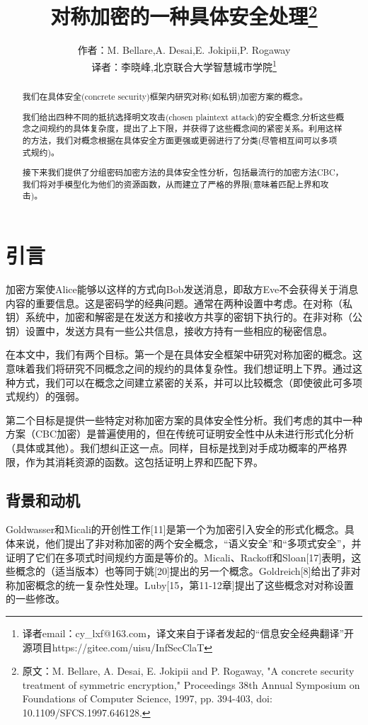 \documentclass[]{article}
\title{对称加密的一种具体安全处理\footnote{原文：M. Bellare, A. Desai, E. Jokipii and P. Rogaway, "A concrete security treatment of symmetric encryption," Proceedings 38th Annual Symposium on Foundations of Computer Science, 1997, pp. 394-403, doi: 10.1109/SFCS.1997.646128.}}
\author{作者：M. Bellare,A. Desai,E. Jokipii,P. Rogaway\\
\small{译者：李晓峰,北京联合大学智慧城市学院\footnote{译者email：cy\_lxf@163.com，译文来自于译者发起的“信息安全经典翻译”开源项目https://gitee.com/uisu/InfSecClaT}}
}
\begin{document}
\maketitle

\begin{abstract}
我们在具体安全(concrete security)框架内研究对称(如私钥)加密方案的概念。\par
我们给出四种不同的抵抗选择明文攻击(chosen plaintext attack)的安全概念,分析这些概念之间规约的具体复杂度，提出了上下限，并获得了这些概念间的紧密关系。利用这样的方法，我们对概念根据在具体安全方面更强或更弱进行了分类(尽管相互间可以多项式规约)。\par
接下来我们提供了分组密码加密方法的具体安全性分析，包括最流行的加密方法CBC，我们将对手模型化为他们的资源函数，从而建立了严格的界限(意味着匹配上界和攻击)。
\end{abstract}

\section{引言}
加密方案使Alice能够以这样的方式向Bob发送消息，即敌方Eve不会获得关于消息内容的重要信息。这是密码学的经典问题。通常在两种设置中考虑。在对称（私钥）系统中，加密和解密是在发送方和接收方共享的密钥下执行的。在非对称（公钥）设置中，发送方具有一些公共信息，接收方持有一些相应的秘密信息。\par

在本文中，我们有两个目标。第一个是在具体安全框架中研究对称加密的概念。这意味着我们将研究不同概念之间的规约的具体复杂性。我们想证明上下界。通过这种方式，我们可以在概念之间建立紧密的关系，并可以比较概念（即使彼此可多项式规约）的强弱。\par

第二个目标是提供一些特定对称加密方案的具体安全性分析。我们考虑的其中一种方案（CBC加密）是普遍使用的，但在传统可证明安全性中从未进行形式化分析（具体或其他）。我们想纠正这一点。同样，目标是找到对手成功概率的严格界限，作为其消耗资源的函数。这包括证明上界和匹配下界。

\subsection{背景和动机}
Goldwasser和Micali的开创性工作[11]是第一个为加密引入安全的形式化概念。具体来说，他们提出了非对称加密的两个安全概念，“语义安全”和“多项式安全”，并证明了它们在多项式时间规约方面是等价的。Micali、Rackoff和Sloan[17]表明，这些概念的（适当版本）也等同于姚[20]提出的另一个概念。Goldreich[8]给出了非对称加密概念的统一复杂性处理。Luby[15，第11-12章]提出了这些概念对对称设置的一些修改。
\par
\end{document}
